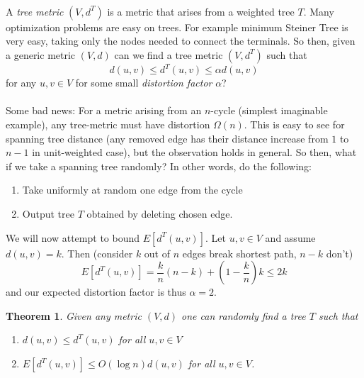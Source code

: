 \documentclass[letterpaper,12pt,oneside,onecolumn]{article}
\newtheorem{theorem}[fact]{Theorem}
\begin{document}
\paragraph{}
A {\it tree metric} $(V,d^T)$ is a metric that arises from a weighted tree $T$. Many optimization problems are easy on trees. For example minimum Steiner Tree is very easy, taking only the nodes needed to connect the terminals. So then, given a generic metric $(V,d)$ can we find a tree metric $(V,d^T)$ such that
$$d(u,v) \leq d^T(u,v) \leq \alpha d(u,v)$$
for any $u,v \in V$ for some small {\it distortion factor} $\alpha$?
\paragraph{}
Some bad news: For a metric arising from an $n$-cycle (simplest imaginable example), any tree-metric must have distortion $\Omega(n)$. This is easy to see for spanning tree distance (any removed edge has their distance increase from $1$ to $n-1$ in unit-weighted case), but the observation holds in general. So then, what if we take a spanning tree randomly? In other words, do the following:
\begin{enumerate}
\item Take uniformly at random one edge from the cycle
\item Output tree $T$ obtained by deleting chosen edge.
\end{enumerate}
We will now attempt to bound $E[d^T(u,v)]$. Let $u,v \in V$ and assume $d(u,v) = k$. Then (consider $k$ out of $n$ edges break shortest path, $n-k$ don't)
$$E[d^T(u,v)] = \frac{k}{n}(n-k) + (1-\frac{k}{n})k \leq 2k$$
and our expected distortion factor is thus $\alpha = 2$.
\begin{theorem}
Given any metric $(V,d)$ one can randomly find a tree $T$ such that
\begin{enumerate}
\item $d(u,v) \leq d^T(u,v)$ for all $u,v\in V$
\item $E[d^T(u,v)] \leq O(\log n) d(u,v)$ for all $u,v\in V$.
\end{enumerate}
\end{theorem}
\end{document}
